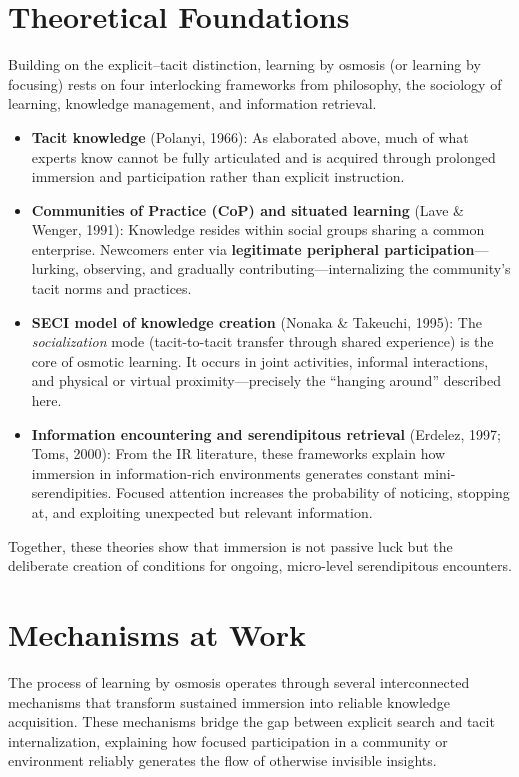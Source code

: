 \documentclass[11pt,a4paper]{article}
\begin{document}
\section{Theoretical Foundations}
Building on the explicit--tacit distinction, learning by osmosis (or learning by focusing) rests on four interlocking frameworks from philosophy, the sociology of learning, knowledge management, and information retrieval.

\begin{itemize}
\item \textbf{Tacit knowledge} (Polanyi, 1966): As elaborated above, much of what experts know cannot be fully articulated and is acquired through prolonged immersion and participation rather than explicit instruction.
\item \textbf{Communities of Practice (CoP) and situated learning} (Lave \& Wenger, 1991): Knowledge resides within social groups sharing a common enterprise. Newcomers enter via \textbf{legitimate peripheral participation}---lurking, observing, and gradually contributing---internalizing the community's tacit norms and practices.
\item \textbf{SECI model of knowledge creation} (Nonaka \& Takeuchi, 1995): The \emph{socialization} mode (tacit-to-tacit transfer through shared experience) is the core of osmotic learning. It occurs in joint activities, informal interactions, and physical or virtual proximity---precisely the ``hanging around'' described here.
\item \textbf{Information encountering and serendipitous retrieval} (Erdelez, 1997; Toms, 2000): From the IR literature, these frameworks explain how immersion in information-rich environments generates constant mini-serendipities. Focused attention increases the probability of noticing, stopping at, and exploiting unexpected but relevant information.
\end{itemize}

Together, these theories show that immersion is not passive luck but the deliberate creation of conditions for ongoing, micro-level serendipitous encounters.

\section{Mechanisms at Work}
The process of learning by osmosis operates through several interconnected mechanisms that transform sustained immersion into reliable knowledge acquisition. These mechanisms bridge the gap between explicit search and tacit internalization, explaining how focused participation in a community or environment reliably generates the flow of otherwise invisible insights.
\end{document}
